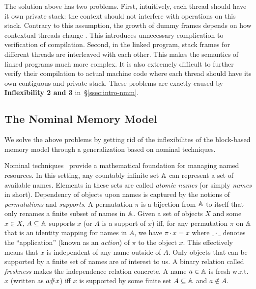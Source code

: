 The solution above has two problems.
%
First, intuitively, each thread should have it own private stack:
the context should not interfere with operations on this stack.
Contrary to this assumption, the growth of dummy frames depends
on how contextual threads change \nextblock. This introduces
unnecessary complication to verification of compilation.
%
Second, in the linked program, stack frames for different threads are
interleaved with each other. This makes the semantics of
linked programs much more complex. It is also extremely difficult to
further verify their compilation to actual machine code where each
thread should have its own contiguous and private stack.
%
These problems are exactly caused by
\textbf{Inflexibility 2 and 3} in~\S\ref{ssec:intro-nmm}.

\subsection{The Nominal Memory Model}
\label{ssec:nominal-nmm}

We solve the above problems by getting rid of the inflexibilites of
the block-based memory model through a generalization based on nominal
techniques.

Nominal techniques~\cite{pitts-nominal,gabby2002} provide a
mathematical foundation for managing named resources. 
%
In this setting, any countably infinite set $\mathbb{A}$ can
represent a set of available names. Elements in these sets are called
\emph{atomic names} (or simply \emph{names} in short). Dependency of
objects upon names is captured by the notions of \emph{permutations}
and \emph{supports}. A permutation $\pi$ is a bijection from
$\mathbb{A}$ to itself that only renames a finite subset of names in
$\mathbb{A}$. Given a set of objects $X$ and some $x \in X$, $A
\subseteq \mathbb{A}$ supports $x$ (or $A$ is a support of $x$) iff,
for any permutation $\pi$ on $\mathbb{A}$ that is an identity mapping
for names in $A$, we have $\pi \cdot x = x$ where $\_ \cdot \_$
denotes the ``application'' (known as an \emph{action}) of $\pi$ to the
object $x$. This effectively means that $x$ is independent of any name
outside of $A$.
%
Only objects that can be supported by a finite set of names are of
interest to us.
%
A binary relation called \emph{freshness} makes the independence
relation concrete. A name $a\in \mathbb{A}$ is fresh w.r.t. $x$
(written as $a \# x$) iff $x$ is supported by some finite set $A
\subseteq \mathbb{A}$ and $a \not\in A$.

